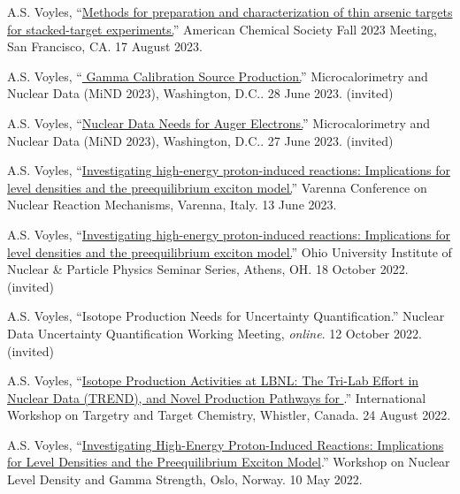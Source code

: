 \begin{bibsection}
\item A.S. Voyles, \enquote{\href{https://acs.digitellinc.com/sessions/583121/view}{Methods for preparation and characterization of thin arsenic targets for stacked-target experiments.}} American Chemical Society Fall 2023 Meeting, San Francisco, CA. 17 August 2023. 

\item A.S. Voyles, \enquote{\href{https://conferences.lbl.gov/event/1243/contributions/7407/}{ Gamma Calibration Source Production.}} Microcalorimetry and Nuclear Data (MiND 2023), Washington, D.C.. 28 June 2023. (invited)

\item A.S. Voyles, \enquote{\href{https://conferences.lbl.gov/event/1243/contributions/7398/}{Nuclear Data Needs for Auger
Electrons.}} Microcalorimetry and Nuclear Data (MiND 2023), Washington, D.C.. 27 June 2023. (invited)

\item A.S. Voyles, \enquote{\href{https://indico.cern.ch/event/1132769/contributions/5395295/}{Investigating high-energy proton-induced reactions: Implications for level densities and the preequilibrium exciton model.}}  Varenna Conference on Nuclear Reaction Mechanisms, Varenna, Italy. 13 June 2023. 

\item A.S. Voyles, \enquote{\href{https://inpp.ohio.edu/~inpp/seminars/abstracts_fall2022/INPP_18Oct22.pdf}{Investigating high-energy proton-induced reactions: Implications for level densities and the preequilibrium exciton model.}} Ohio University Institute of Nuclear \& Particle Physics Seminar Series, Athens, OH. 18 October 2022. (invited)

\item A.S. Voyles, \enquote{Isotope Production Needs for Uncertainty Quantification.} Nuclear Data Uncertainty Quantification Working Meeting, \emph{online}. 12 October 2022. (invited)

\item A.S. Voyles, \enquote{\href{https://meetings.triumf.ca/event/108/contributions/3718/}{Isotope Production Activities at LBNL: The Tri-Lab Effort in Nuclear Data (TREND), and Novel Production Pathways for }.}  International Workshop on Targetry and Target Chemistry, Whistler, Canada. 24 August 2022.

\item A.S. Voyles, \enquote{\href{https://www.mn.uio.no/fysikk/english/research/news-and-events/events/conferences/gamma8/program/book_of_abstracts.pdf}{Investigating High-Energy Proton-Induced Reactions: Implications for Level Densities and the Preequilibrium Exciton Model}.}   Workshop on Nuclear Level Density and Gamma Strength, Oslo, Norway. 10 May 2022.


\end{bibsection}
